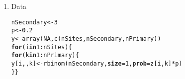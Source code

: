 \documentclass[color=usenames,dvipsnames]{beamer}\usepackage[]{graphicx}\usepackage[]{color}
\makeatletter
\newcommand{\hlnum}[1]{\textcolor[rgb]{0.69,0.494,0}{#1}}%
\newcommand{\hlopt}[1]{\textcolor[rgb]{0,0,0}{#1}}%
\newcommand{\hlstd}[1]{\textcolor[rgb]{0,0,0}{#1}}%
\newcommand{\hlkwa}[1]{\textcolor[rgb]{0,0,0}{\textbf{#1}}}%
\newcommand{\hlkwb}[1]{\textcolor[rgb]{0,0.341,0.682}{#1}}%
\newcommand{\hlkwc}[1]{\textcolor[rgb]{0,0,0}{\textbf{#1}}}%
\newcommand{\hlkwd}[1]{\textcolor[rgb]{0.004,0.004,0.506}{#1}}%
\newenvironment{kframe}{%
 \def\at@end@of@kframe{}%
 \ifinner\ifhmode%
  \def\at@end@of@kframe{\end{minipage}}%
  \begin{minipage}{\columnwidth}%
 \fi\fi%
 \def\FrameCommand##1{\hskip\@totalleftmargin \hskip-\fboxsep
 \colorbox{shadecolor}{##1}\hskip-\fboxsep
     \hskip-\linewidth \hskip-\@totalleftmargin \hskip\columnwidth}%
 \MakeFramed {\advance\hsize-\width
   \@totalleftmargin\z@ \linewidth\hsize
   \@setminipage}}%
 {\par\unskip\endMakeFramed%
 \at@end@of@kframe}
\newenvironment{knitrout}{}{} %
\makeatother
\begin{document}
\begin{frame}[fragile]
\begin{enumerate}[<+->]
  \item Data
\begin{knitrout}\scriptsize
{}\color{fgcolor}\begin{kframe}
\begin{alltt}
\hlstd{nSecondary} \hlkwb{<-} \hlnum{3}
\hlstd{p} \hlkwb{<-} \hlnum{0.2}
\hlstd{y} \hlkwb{<-} \hlkwd{array}\hlstd{(}\hlnum{NA}\hlstd{,} \hlkwd{c}\hlstd{(nSites, nSecondary, nPrimary))}
\hlkwa{for}\hlstd{(i} \hlkwa{in} \hlnum{1}\hlopt{:}\hlstd{nSites) \{}
    \hlkwa{for}\hlstd{(k} \hlkwa{in} \hlnum{1}\hlopt{:}\hlstd{nPrimary) \{}
        \hlstd{y[i,,k]} \hlkwb{<-} \hlkwd{rbinom}\hlstd{(nSecondary,} \hlkwc{size}\hlstd{=}\hlnum{1}\hlstd{,} \hlkwc{prob}\hlstd{=z[i,k]}\hlopt{*}\hlstd{p)}
    \hlstd{\} \}}
\end{alltt}
\end{kframe}
\end{knitrout}
\end{enumerate}
\end{frame}
\end{document}
